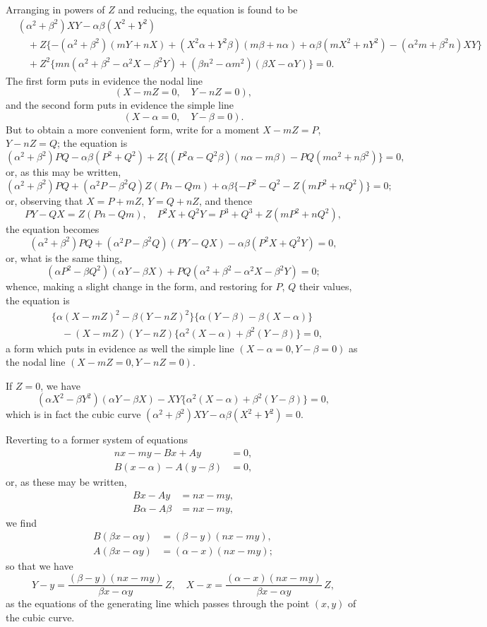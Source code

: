 \documentclass[11pt,a4paper]{article}
\theoremstyle{plain}
\begin{document}
Arranging in powers of $Z$ and reducing, the equation is found to be
\begin{align*}
&(\alpha^2 + \beta^2)XY - \alpha\beta(X^2 + Y^2) \\
&\quad + Z\{-(\alpha^2 + \beta^2)(mY + nX) + (X^2\alpha + Y^2\beta)(m\beta + n\alpha) + \alpha\beta(mX^2 + nY^2) - (\alpha^2 m + \beta^2 n)XY\} \\
&\quad + Z^2\{mn(\alpha^2 + \beta^2 - \alpha^2 X - \beta^2 Y) + (\beta n^2 - \alpha m^2)(\beta X - \alpha Y)\} = 0.
\end{align*}
The first form puts in evidence the nodal line
\[
(X - mZ = 0, \quad Y - nZ = 0),
\]
and the second form puts in evidence the simple line
\[
(X - \alpha = 0, \quad Y - \beta = 0).
\]
But to obtain a more convenient form, write for a moment $X - mZ = P$, $Y - nZ = Q$; the equation is
\[
(\alpha^2 + \beta^2)PQ - \alpha\beta(P^2 + Q^2) + Z\{(P^2\alpha - Q^2\beta)(n\alpha - m\beta) - PQ(m\alpha^2 + n\beta^2)\} = 0,
\]
or, as this may be written,
\[
(\alpha^2 + \beta^2)PQ + (\alpha^2 P - \beta^2 Q)Z(Pn - Qm) + \alpha\beta\{-P^2 - Q^2 - Z(mP^2 + nQ^2)\} = 0;
\]
or, observing that $X = P + mZ$, $Y = Q + nZ$, and thence
\[
PY - QX = Z(Pn - Qm), \quad P^2 X + Q^2 Y = P^3 + Q^3 + Z(mP^2 + nQ^2),
\]
the equation becomes
\[
(\alpha^2 + \beta^2)PQ + (\alpha^2 P - \beta^2 Q)(PY - QX) - \alpha\beta(P^2 X + Q^2 Y) = 0,
\]
or, what is the same thing,
\[
(\alpha P^2 - \beta Q^2)(\alpha Y - \beta X) + PQ(\alpha^2 + \beta^2 - \alpha^2 X - \beta^2 Y) = 0;
\]
whence, making a slight change in the form, and restoring for $P$, $Q$ their values, the equation is
\begin{align*}
&\{\alpha(X - mZ)^2 - \beta(Y - nZ)^2\}\{\alpha(Y - \beta) - \beta(X - \alpha)\} \\
&\quad - (X - mZ)(Y - nZ)\{\alpha^2(X - \alpha) + \beta^2(Y - \beta)\} = 0,
\end{align*}
a form which puts in evidence as well the simple line $(X - \alpha = 0, Y - \beta = 0)$ as the nodal line $(X - mZ = 0, Y - nZ = 0)$.

If $Z = 0$, we have
\[
(\alpha X^2 - \beta Y^2)(\alpha Y - \beta X) - XY\{\alpha^2(X - \alpha) + \beta^2(Y - \beta)\} = 0,
\]
which is in fact the cubic curve $(\alpha^2 + \beta^2)XY - \alpha\beta(X^2 + Y^2) = 0$.

Reverting to a former system of equations
\begin{align*}
nx - my - Bx + Ay &= 0, \\
B(x - \alpha) - A(y - \beta) &= 0,
\end{align*}
or, as these may be written,
\begin{align*}
Bx - Ay &= nx - my, \\
B\alpha - A\beta &= nx - my,
\end{align*}
we find
\begin{align*}
B(\beta x - \alpha y) &= (\beta - y)(nx - my), \\
A(\beta x - \alpha y) &= (\alpha - x)(nx - my);
\end{align*}
so that we have
\[
Y - y = \frac{(\beta - y)(nx - my)}{\beta x - \alpha y}\,Z, \quad X - x = \frac{(\alpha - x)(nx - my)}{\beta x - \alpha y}\,Z,
\]
as the equations of the generating line which passes through the point $(x, y)$ of the cubic curve.
\end{document}
